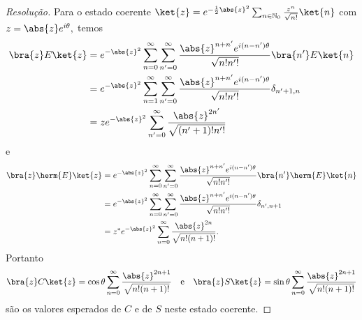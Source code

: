 \begin{proof}[Resolução]
   Para o estado coerente \(\ket{z} = e^{-\frac12 \abs{z}^2} \sum_{n \in \mathbb{N}_0} \frac{z^n}{\sqrt{n!}} \ket{n}\) com \(z = \abs{z} e^{i\theta},\) temos
   \begin{align*}
      \bra{z}E\ket{z} &= e^{-\abs{z}^2} \sum_{n = 0}^\infty \sum_{n' = 0}^\infty \frac{\abs{z}^{n + n'} e^{i(n - n')\theta}}{\sqrt{n! n'!}} \bra{n'} E \ket{n}\\
                      &= e^{-\abs{z}^2} \sum_{n = 1}^\infty \sum_{n' = 0}^\infty \frac{\abs{z}^{n + n'} e^{i(n - n')\theta}}{\sqrt{n! n'!}} \delta_{n' + 1,n}\\
                      & = z e^{-\abs{z}^2} \sum_{n' = 0}^\infty \frac{\abs{z}^{2n'}}{\sqrt{(n' + 1)! n'!}}
   \end{align*}
   e
   \begin{align*}
      \bra{z}\herm{E}\ket{z} &= e^{-\abs{z}^2} \sum_{n = 0}^\infty \sum_{n' = 0}^\infty \frac{\abs{z}^{n + n'} e^{i(n - n')\theta}}{\sqrt{n! n'!}} \bra{n'} \herm{E} \ket{n}\\
                      &= e^{-\abs{z}^2} \sum_{n = 0}^\infty \sum_{n' = 0}^\infty \frac{\abs{z}^{n + n'} e^{i(n - n')\theta}}{\sqrt{n! n'!}} \delta_{n',n+1}\\
                      & = z^* e^{-\abs{z}^2} \sum_{n = 0}^\infty \frac{\abs{z}^{2n}}{\sqrt{n!(n + 1)! }}.
   \end{align*}
   Portanto
   \begin{equation*}
      \bra{z}C\ket{z} = \cos\theta \sum_{n= 0}^\infty \frac{\abs{z}^{2n+1}}{\sqrt{n! (n+1)!}}
      \quad\text{e}\quad
      \bra{z}S\ket{z} = \sin\theta \sum_{n= 0}^\infty \frac{\abs{z}^{2n+1}}{\sqrt{n! (n+1)!}}
   \end{equation*}
   são os valores esperados de \(C\) e de \(S\) neste estado coerente.
\end{proof}
